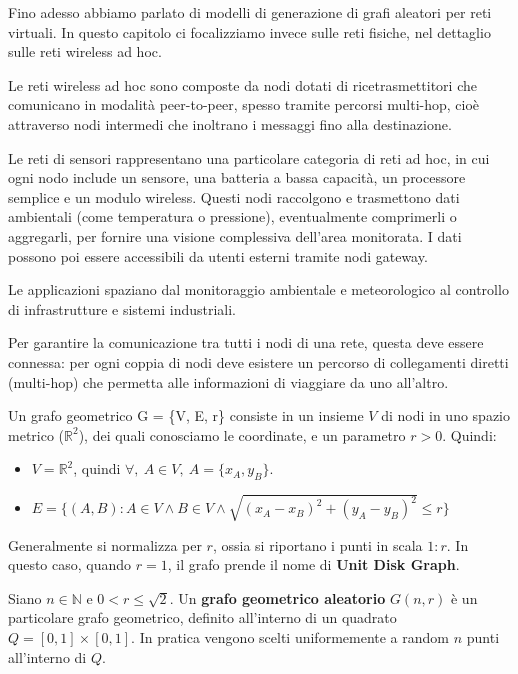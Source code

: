 Fino adesso abbiamo parlato di modelli di generazione di grafi aleatori per reti virtuali. In questo capitolo ci focalizziamo invece sulle reti fisiche, nel dettaglio sulle reti wireless ad hoc.

Le reti wireless ad hoc sono composte da nodi dotati di ricetrasmettitori che comunicano in modalità peer-to-peer, spesso tramite percorsi multi-hop, cioè attraverso nodi intermedi che inoltrano i messaggi fino alla destinazione.  

Le reti di sensori rappresentano una particolare categoria di reti ad hoc, in cui ogni nodo include un sensore, una batteria a bassa capacità, un processore semplice e un modulo wireless. Questi nodi raccolgono e trasmettono dati ambientali (come temperatura o pressione), eventualmente comprimerli o aggregarli, per fornire una visione complessiva dell'area monitorata. I dati possono poi essere accessibili da utenti esterni tramite nodi gateway.  

Le applicazioni spaziano dal monitoraggio ambientale e meteorologico al controllo di infrastrutture e sistemi industriali.

Per garantire la comunicazione tra tutti i nodi di una rete, questa deve essere connessa: per ogni coppia di nodi deve esistere un percorso di collegamenti diretti (multi-hop) che permetta alle informazioni di viaggiare da uno all'altro.

\vspace{0.5cm}

\begin{definizione}
    Un grafo geometrico G = \{V, E, r\} consiste in un insieme $V$ di nodi in uno spazio metrico ($\mathbb{R}^2$), dei quali conosciamo le coordinate, e un parametro $r > 0$. Quindi: 
    \begin{itemize}
        \item $V = \mathbb{R}^2$, quindi $\forall,\ A \in V,\ A = \{x_A, y_B\}$.
        \item $E = \{(A, B): A \in V \land B \in V \land \sqrt{(x_A - x_B)^2 + (y_A - y_B)^2} \leq r\}$
    \end{itemize}
\end{definizione}

Generalmente si normalizza per $r$, ossia si riportano i punti in scala $1:r$. In questo caso, quando $r = 1$, il grafo prende il nome di \textbf{Unit Disk Graph}.

\vspace{0.5cm}

\begin{definizione}
    Siano $n \in \mathbb{N}$ e $0 < r \leq \sqrt{2}$. Un \textbf{grafo geometrico aleatorio} $G(n, r)$ è un particolare grafo geometrico, definito all'interno di un quadrato $Q = [0,1] \times [0, 1]$. In pratica vengono scelti uniformemente a random $n$ punti all'interno di $Q$.
\end{definizione}

